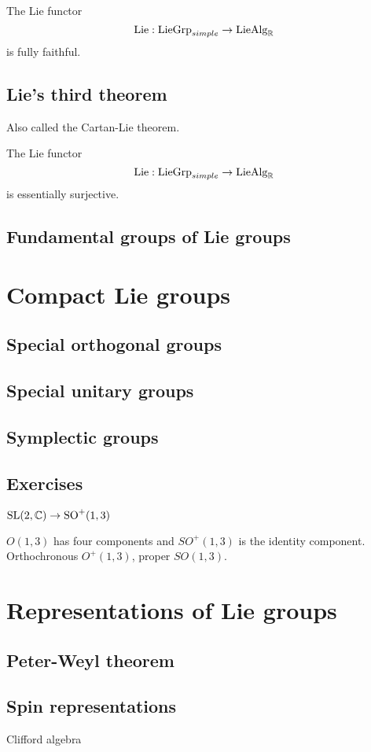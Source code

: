 \documentclass{../../large}
\begin{document}
\begin{prb}[]
\begin{parts}
\item The Lie functor
\[\mathrm{Lie}:\mathrm{LieGrp}_{simple}\to\mathrm{LieAlg}_{\mathbb{R}}\]
is fully faithful.
\end{parts}
\end{prb}


\section{Lie's third theorem}
\begin{prb}
\end{prb}

\begin{prb}
Also called the Cartan-Lie theorem.
\begin{parts}
\item The Lie functor
\[\mathrm{Lie}:\mathrm{LieGrp}_{simple}\to\mathrm{LieAlg}_{\mathbb{R}}\]
is essentially surjective.
\end{parts}
\end{prb}

\section{Fundamental groups of Lie groups}



\chapter{Compact Lie groups}
\section{Special orthogonal groups}
\section{Special unitary groups}
\section{Symplectic groups}

\section*{Exercises}
\begin{prb}
$\mathrm{SL}(2,\mathbb{C})\to\mathrm{SO}^+(1,3)$
\begin{parts}
\item $O(1,3)$ has four components and $SO^+(1,3)$ is the identity component. Orthochronous $O^+(1,3)$, proper $SO(1,3)$.
\end{parts}
\end{prb}


\chapter{Representations of Lie groups}
\section{Peter-Weyl theorem}
\section{Spin representations}
Clifford algebra
\end{document}
